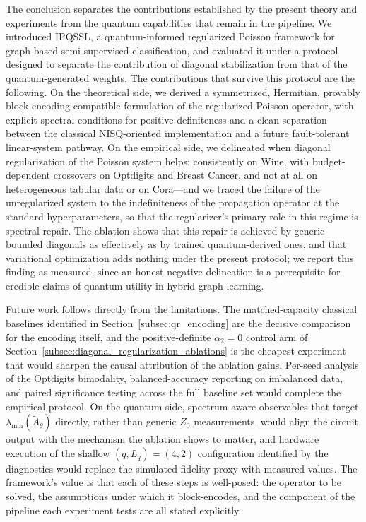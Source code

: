 \documentclass[11pt,a4paper]{article}
\begin{document}
The conclusion separates the contributions established by the present theory
and experiments from the quantum capabilities that remain in the pipeline.
We introduced \textsc{IPQSSL}, a quantum-informed regularized Poisson
framework for graph-based semi-supervised classification, and evaluated it
under a protocol designed to separate the contribution of diagonal
stabilization from that of the quantum-generated weights. The contributions
that survive this protocol are the following. On the theoretical side, we
derived a symmetrized, Hermitian, provably block-encoding-compatible
formulation of the regularized Poisson operator, with explicit spectral
conditions for positive definiteness and a clean separation between the
classical NISQ-oriented implementation and a future fault-tolerant
linear-system pathway. On the empirical side, we delineated when diagonal
regularization of the Poisson system helps: consistently on Wine, with
budget-dependent crossovers on Optdigits and Breast Cancer, and not at all
on heterogeneous tabular data or on Cora—and we traced the failure of
the unregularized system to the indefiniteness of the propagation operator
at the standard hyperparameters, so that the regularizer's primary role in
this regime is spectral repair. The ablation shows that this repair is
achieved by generic bounded diagonals as effectively as by trained
quantum-derived ones, and that variational optimization adds nothing under
the present protocol; we report this finding as measured, since an honest
negative delineation is a prerequisite for credible claims of quantum
utility in hybrid graph learning.

Future work follows directly from the limitations. The matched-capacity
classical baselines identified in Section~\ref{subsec:qr_encoding} are the
decisive comparison for the encoding itself, and the positive-definite
$\alpha_2=0$ control arm of
Section~\ref{subsec:diagonal_regularization_ablations} is the cheapest
experiment that would sharpen the causal attribution of the ablation
gains. Per-seed analysis of the
Optdigits bimodality, balanced-accuracy reporting on imbalanced data, and
paired significance testing across the full baseline set would complete
the empirical protocol. On the quantum side, spectrum-aware observables
that target $\lambda_{\min}(\widetilde A_\theta)$ directly, rather than
generic $Z_0$ measurements, would align the circuit output with the
mechanism the ablation shows to matter, and hardware execution of the
shallow $(q,L_q)=(4,2)$ configuration identified by the diagnostics would
replace the simulated fidelity proxy with measured values. The framework's
value is that each of these steps is well-posed: the operator to be
solved, the assumptions under which it block-encodes, and the component of
the pipeline each experiment tests are all stated explicitly.
\end{document}
